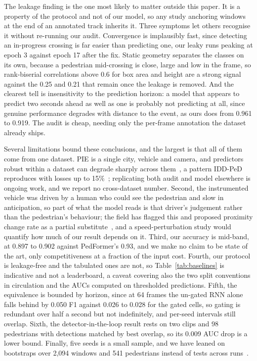 \documentclass[mti,article,submit,moreauthors]{Definitions/mdpi}
\begin{document}
The leakage finding is the one most likely to matter outside this paper. It is a property of the protocol and not of our model, so any study anchoring windows at the end of an annotated track inherits it. Three symptoms let others recognise it without re-running our audit. Convergence is implausibly fast, since detecting an in-progress crossing is far easier than predicting one, our leaky runs peaking at epoch 3 against epoch 17 after the fix. Static geometry separates the classes on its own, because a pedestrian mid-crossing is close, large and low in the frame, so rank-biserial correlations above 0.6 for box area and height are a strong signal against the 0.25 and 0.21 that remain once the leakage is removed. And the clearest tell is insensitivity to the prediction horizon: a model that appears to predict two seconds ahead as well as one is probably not predicting at all, since genuine performance degrades with distance to the event, as ours does from 0.961 to 0.919. The audit is cheap, needing only the per-frame annotation the dataset already ships.

Several limitations bound these conclusions, and the largest is that all of them come from one dataset. PIE is a single city, vehicle and camera, and predictors robust within a dataset can degrade sharply across them~\citep{gesnouin2022assessing}, a pattern IDD-PeD reproduces with losses up to 15\%~\citep{bokkasam2025iddped}; replicating both audit and model elsewhere is ongoing work, and we report no cross-dataset number. Second, the instrumented vehicle was driven by a human who could see the pedestrian and slow in anticipation, so part of what the model reads is that driver's judgement rather than the pedestrian's behaviour; the field has flagged this and proposed proximity change rate as a partial substitute~\citep{azarmi2024featureimportance}, and a speed-perturbation study would quantify how much of our result depends on it. Third, our accuracy is mid-band, at 0.897 to 0.902 against PedFormer's 0.93, and we make no claim to be state of the art, only competitiveness at a fraction of the input cost. Fourth, our protocol is leakage-free and the tabulated ones are not, so Table~\ref{tab:baselines} is indicative and not a leaderboard, a caveat covering also the two split conventions in circulation and the AUCs computed on thresholded predictions. Fifth, the equivalence is bounded by horizon, since at 64 frames the un-gated RNN alone falls behind by 0.050 F1 against 0.026 to 0.028 for the gated cells, so gating is redundant over half a second but not indefinitely, and per-seed intervals still overlap. Sixth, the detector-in-the-loop result rests on two clips and 98 pedestrians with detections matched by best overlap, so its 0.009 AUC drop is a lower bound. Finally, five seeds is a small sample, and we have leaned on bootstraps over 2,094 windows and 541 pedestrians instead of tests across runs~\citep{bouthillier2021variance}.
\end{document}
